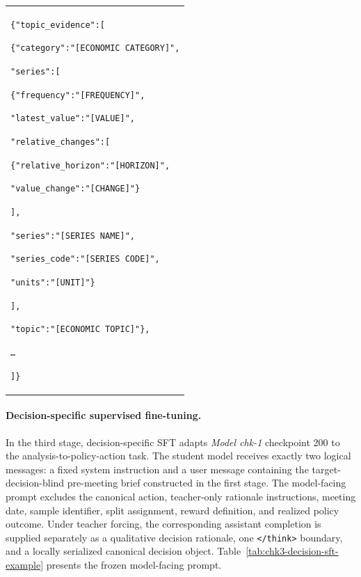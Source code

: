 \begin{center}
\begin{singlespace}
\begin{footnotesize}
\begin{longtable}{@{}p{}@{}}
    \texttt{\{"topic\_evidence":[}
    \par
    \texttt{\quad\{"category":"[ECONOMIC CATEGORY]",}
    \par
    \texttt{\qquad"series":[}
    \par
    \texttt{\qquad\quad\{"frequency":"[FREQUENCY]",}
    \par
    \texttt{\qquad\qquad"latest\_value":"[VALUE]",}
    \par
    \texttt{\qquad\qquad"relative\_changes":[}
    \par
    \texttt{\qquad\qquad\quad\{"relative\_horizon":"[HORIZON]",}
    \par
    \texttt{\qquad\qquad\qquad"value\_change":"[CHANGE]"\}}
    \par
    \texttt{\qquad\qquad],}
    \par
    \texttt{\qquad\qquad"series":"[SERIES NAME]",}
    \par
    \texttt{\qquad\qquad"series\_code":"[SERIES CODE]",}
    \par
    \texttt{\qquad\qquad"units":"[UNIT]"\}}
    \par
    \texttt{\qquad],}
    \par
    \texttt{\qquad"topic":"[ECONOMIC TOPIC]"\},}
    \par
    \texttt{\quad\ldots}
    \par
    \texttt{]\}}
    \\

\end{longtable}
\end{footnotesize}
\end{singlespace}
\end{center}




\paragraph*{Decision-specific supervised fine-tuning.}

In the third stage, decision-specific SFT adapts \textit{Model chk-1} checkpoint 200 to the analysis-to-policy-action task. The student model receives exactly two logical messages: a fixed system instruction and a user message containing the target-decision-blind pre-meeting brief constructed in the first stage. The model-facing prompt excludes the canonical action, teacher-only rationale instructions, meeting date, sample identifier, split assignment, reward definition, and realized policy outcome. Under teacher forcing, the corresponding assistant completion is supplied separately as a qualitative decision rationale, one \texttt{</think>} boundary, and a locally serialized canonical decision object. Table~\ref{tab:chk3-decision-sft-example} presents
the frozen model-facing prompt.


